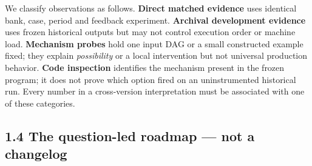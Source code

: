 \documentclass[a4paper,10pt]{article}
\theoremstyle{definition}
\theoremstyle{remark}
\begin{document}
We classify observations as follows. \textbf{Direct matched evidence} uses identical bank, case, period and feedback experiment. \textbf{Archival development evidence} uses frozen historical outputs but may not control execution order or machine load. \textbf{Mechanism probes} hold one input DAG or a small constructed example fixed; they explain \emph{possibility} or a local intervention but not universal production behavior. \textbf{Code inspection} identifies the mechanism present in the frozen program; it does not prove which option fired on an uninstrumented historical run. Every number in a cross-version interpretation must be associated with one of these categories.

\subsection{1.4 The question-led roadmap --- not a changelog}\label{the-question-led-roadmap-not-a-changelog}
\end{document}
